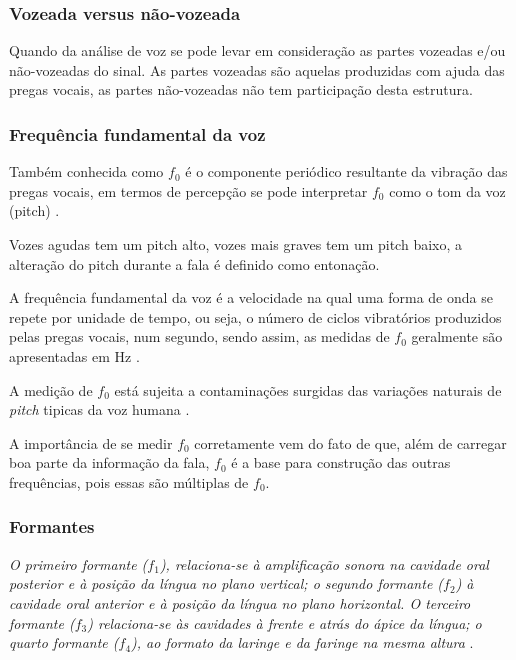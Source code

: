\begin{myenv}{1.5}
				\subsubsection{Vozeada versus não-vozeada}

				\par Quando da análise de voz se pode levar em consideração as partes vozeadas e/ou não-vozeadas do sinal. As partes vozeadas são aquelas produzidas com ajuda das pregas vocais, as partes não-vozeadas não tem participação desta estrutura.
				
				\subsubsection{Frequência fundamental da voz}
					\par Também conhecida como $f_0$ é o componente periódico resultante da vibração das pregas vocais, em termos de percepção se pode interpretar $f_0$ como o tom da voz (pitch) \cite{kremer2014eficiencia}.
				
					\par Vozes agudas tem um pitch alto, vozes mais graves tem um pitch baixo, a alteração do pitch durante a fala é definido como entonação.
					
					\par A frequência fundamental da voz é a velocidade na qual uma forma de onda se repete
					por unidade de tempo, ou seja, o número de ciclos vibratórios produzidos pelas pregas vocais, num segundo, sendo assim, as medidas de $f_0$ geralmente são apresentadas em Hz \cite{freitas2013avaliaccao}.
				
					\par A medição de $f_0$ está sujeita a contaminações surgidas das variações naturais de \textit{pitch} tipicas da voz humana \cite{freitas2013avaliaccao}.
					
					\par A importância de se medir $f_0$ corretamente vem do fato de que, além de carregar boa parte da informação da fala, $f_0$ é a base para construção das outras frequências, pois essas são múltiplas de $f_0$.
					
					\subsubsection{Formantes}
					
					\par \textit{O primeiro formante ($f_1$), relaciona-se à  amplificação  sonora  na  cavidade  oral  posterior  e  à  posição  da  língua  no  plano  vertical;  o segundo  formante  ($f_2$)  à  cavidade  oral  anterior  e  à  posição  da  língua  no  plano  horizontal.  O terceiro  formante  ($f_3$)  relaciona-se  às  cavidades  à  frente  e  atrás  do  ápice  da  língua;  o  quarto formante  ($f_4$),  ao  formato  da  laringe  e  da  faringe  na  mesma  altura} \cite{valencca2014analise}.


\end{myenv}
